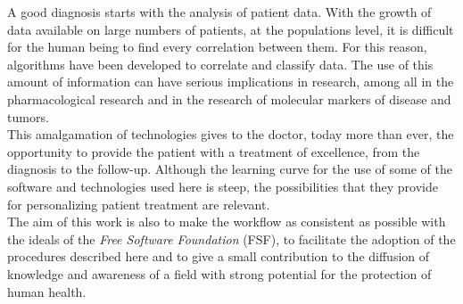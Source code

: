 A good diagnosis starts with the analysis of patient data. With the growth of data available on large numbers of patients, at the populations level, it is difficult for the human being to find every correlation between them. For this reason, algorithms have been developed to correlate and classify data. The use of this amount of information can have serious implications in research, among all in the pharmacological research and in the research of molecular markers of disease and tumors. \\
This amalgamation of technologies gives to the doctor, today more than ever, the opportunity to provide the patient with a treatment of excellence, from the diagnosis to the follow-up. Although the learning curve for the use of some of the software and technologies used here is steep, the possibilities that they provide for personalizing patient treatment are relevant. \\
The aim of this work is also to make the workflow as consistent as possible with the ideals of the \emph{Free Software Foundation} (FSF), to facilitate the adoption of the procedures described here and to give a small contribution to the diffusion of knowledge and awareness of a field with strong potential for the protection of human health.
